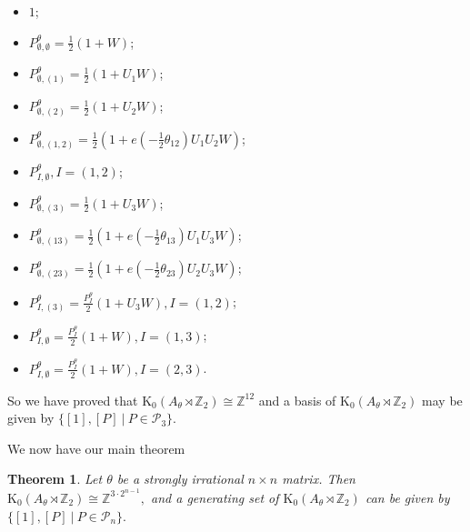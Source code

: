 \documentclass[9pt, BCOR=2mm]{amsart}
\numberwithin{equation}{section}
\numberwithin{equation}{section}
\newtheorem{theorem}{Theorem}[section]
\newcommand{\Z}{{\mathbb{Z}}}
\newcommand{\K}{\mathrm{K}} %
\begin{document}
\begin{itemize}
 \item  $1$;
 \item $P^{\theta}_{\emptyset,\emptyset}= \frac{1}{2} (1+W)$;
 \item $P^{\theta}_{\emptyset,(1)}= \frac{1}{2} (1+U_1W)$;
\item  $P^{\theta}_{\emptyset,(2)}= \frac{1}{2} (1+U_2W)$;
\item  $P^{\theta}_{\emptyset,(1,2)}= \frac{1}{2} (1+e( -\frac{1}{2} {\theta_{12}})U_1U_2W)$;
\item  $P_{I,\emptyset}^{\theta} , I=(1,2)$; 
 \item $P^{\theta}_{\emptyset,(3)}= \frac{1}{2} (1+U_3W)$;
 \item $P^{\theta}_{\emptyset,(13)}= \frac{1}{2} (1+e(-\frac{1}{2}\theta_{13})U_1U_3W)$; 
 \item $P^{\theta}_{\emptyset,(23)}= \frac{1}{2} (1+e(-\frac{1}{2}\theta_{23})U_2U_3W)$; 
\item  $P_{I,(3)}^{\theta}=\frac{P^{\theta}_{I}}{2}(1+U_3W), I=(1,2)$; 
 \item $P_{I,\emptyset}^{\theta}=\frac{P^{\theta}_{I}}{2}(1+W), I=(1,3)$;  
 \item $P_{I,\emptyset}^{\theta}=\frac{P^{\theta}_{I}}{2}(1+W), I=(2,3)$. 
  \end{itemize}
   So we have proved that $\K_0(A_{\theta}\rtimes\Z_2)\cong \Z^{12}$ and a basis  of $\K_0(A_{\theta}\rtimes \Z_2)$ may be  given by 
 $\{[1], [P] ~|~ P\in \mathcal{P}_3\}.$ 
  
  We now have our main theorem
  \begin{theorem}\label{thm:main_K_gen}
  Let $\theta$ be a strongly irrational $n\times n$ matrix. Then
  $\K_0(A_{\theta}\rtimes \Z_2)\cong \Z^{3\cdot 2^{n-1}},$ and a generating set  of $\K_0(A_{\theta}\rtimes \Z_2)$ can be  given by 
 $\{[1], [P] ~|~ P\in \mathcal{P}_n\}.$ 
  	\end{theorem}
  
\end{document}
